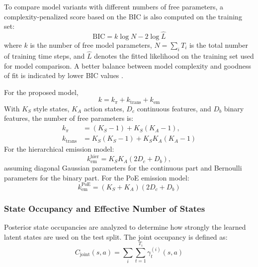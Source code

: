 To compare model variants with different numbers of free parameters, a complexity-penalized score based on the \ac{BIC} is also computed on the training set:
\begin{equation}
\mathrm{BIC} = k \log N - 2 \log \hat{L}
\end{equation}
where $k$ is the number of free model parameters, $N=\sum_i T_i$ is the total
number of training time steps, and \(\hat{L}\) denotes the fitted likelihood on the training set used for model comparison. 
A better balance between model complexity and goodness of fit is indicated by lower \ac{BIC} values \cite{Schwarz1978EstimatingTD}.

For the proposed model,
\begin{equation}
k = k_{\pi} + k_{\mathrm{trans}} + k_{\mathrm{em}}
\end{equation}
With \(K_S\) style states, \(K_A\) action states, \(D_c\) continuous features, and \(D_b\) binary features, the number of free parameters is:
\begin{align}
k_{\pi} &= (K_S-1) + K_S(K_A-1), \\
k_{\mathrm{trans}} &= K_S(K_S-1) + K_S K_A (K_A-1)
\end{align}
For the hierarchical emission model:
\begin{equation}
k_{\mathrm{em}}^{\mathrm{hier}}
=
K_S K_A (2D_c + D_b),
\end{equation}
assuming diagonal Gaussian parameters for the continuous part and Bernoulli parameters for the binary part. 
For the \ac{PoE} emission model:
\begin{equation}
k_{\mathrm{em}}^{\mathrm{PoE}}
=
(K_S + K_A)(2D_c + D_b)
\end{equation}


\subsubsection{State Occupancy and Effective Number of States}

Posterior state occupancies are analyzed to determine how strongly the learned
latent states are used on the test split. The joint occupancy is defined as:
\begin{equation}
C_{\mathrm{joint}}(s,a)
=
\sum_i \sum_{t=1}^{T_i} \gamma_t^{(i)}(s,a)
\end{equation}

